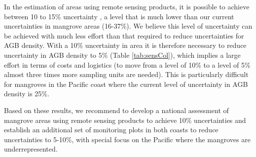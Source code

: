 \documentclass[review, authoryear]{elsarticle}   	%
\begin{document}

In the estimation of areas using remote sensing products, it is possible to achieve between 10 to 15\% uncertainty \citep{IPCC2003}, a level that is much lower than our current uncertainties in mangrove areas (16-37\%).  We believe this level of uncertainty can be achieved with much less effort than that required to reduce uncertainties for AGB density. With a 10\% uncertainty in area it is therefore necessary to reduce uncertainty in AGB density to 5\% (Table \ref{tab:sensCol}), which implies a large effort in terms of costs and logistics (to move from a level of 10\% to a level of 5\% almost three times more sampling units are needed). This is particularly difficult for mangroves in the Pacific coast where the current level of uncertainty in AGB density is 25\%. 

Based on these results, we recommend to develop a national assessment of mangrove areas using remote sensing products to achieve 10\% uncertainties and establish an additional set of monitoring plots in both coasts to reduce uncertainties to 5-10\%, with special focus on the Pacific where the mangroves are underrepresented. 

\end{document}
